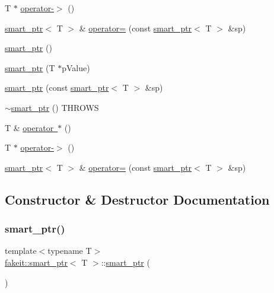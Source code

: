 \begin{DoxyCompactItemize}
\item 
T $\ast$ \mbox{\hyperlink{classfakeit_1_1smart__ptr_aa9b3019d80eee2f376a9b92ef8080ffc}{operator-\/$>$}} ()
\item 
\mbox{\hyperlink{classfakeit_1_1smart__ptr}{smart\+\_\+ptr}}$<$ T $>$ \& \mbox{\hyperlink{classfakeit_1_1smart__ptr_a76edf2172f564378c77dc88a419f6634}{operator=}} (const \mbox{\hyperlink{classfakeit_1_1smart__ptr}{smart\+\_\+ptr}}$<$ T $>$ \&sp)
\item 
\mbox{\hyperlink{classfakeit_1_1smart__ptr_ad718f001e0b0815c80d5cef4f2d4a99a}{smart\+\_\+ptr}} ()
\item 
\mbox{\hyperlink{classfakeit_1_1smart__ptr_afa05248e2dceb62a7ecc706700cfd1bf}{smart\+\_\+ptr}} (T $\ast$p\+Value)
\item 
\mbox{\hyperlink{classfakeit_1_1smart__ptr_a1157d28b4675e32ae90886871fb1b0bd}{smart\+\_\+ptr}} (const \mbox{\hyperlink{classfakeit_1_1smart__ptr}{smart\+\_\+ptr}}$<$ T $>$ \&sp)
\item 
\mbox{\hyperlink{classfakeit_1_1smart__ptr_a0a184c081564a5a22d8ad0a121614bc5}{$\sim$smart\+\_\+ptr}} () T\+H\+R\+O\+WS
\item 
T \& \mbox{\hyperlink{classfakeit_1_1smart__ptr_a6ad907f45c59a2519248f5a79191992e}{operator $\ast$}} ()
\item 
T $\ast$ \mbox{\hyperlink{classfakeit_1_1smart__ptr_aa9b3019d80eee2f376a9b92ef8080ffc}{operator-\/$>$}} ()
\item 
\mbox{\hyperlink{classfakeit_1_1smart__ptr}{smart\+\_\+ptr}}$<$ T $>$ \& \mbox{\hyperlink{classfakeit_1_1smart__ptr_a76edf2172f564378c77dc88a419f6634}{operator=}} (const \mbox{\hyperlink{classfakeit_1_1smart__ptr}{smart\+\_\+ptr}}$<$ T $>$ \&sp)
\end{DoxyCompactItemize}


\subsection{Constructor \& Destructor Documentation}
\mbox{\label{classfakeit_1_1smart__ptr_ad718f001e0b0815c80d5cef4f2d4a99a}} 
\subsubsection{\texorpdfstring{smart\_ptr()}{smart\_ptr()}\hspace{0.1cm}{\footnotesize\ttfamily [1/27]}}
{\footnotesize\ttfamily template$<$typename T$>$ \\
\mbox{\hyperlink{classfakeit_1_1smart__ptr}{fakeit\+::smart\+\_\+ptr}}$<$ T $>$\+::\mbox{\hyperlink{classfakeit_1_1smart__ptr}{smart\+\_\+ptr}} (\begin{DoxyParamCaption}{ }\end{DoxyParamCaption})\hspace{0.3cm}{\ttfamily [inline]}}

